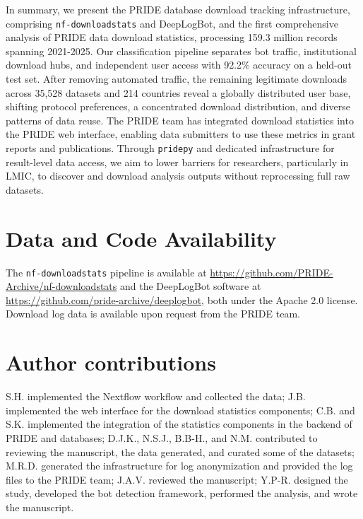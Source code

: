\documentclass[11pt,a4paper]{article}
\begin{document}
\begin{sloppypar}
In summary, we present the PRIDE database download tracking infrastructure, comprising \texttt{nf-downloadstats} and DeepLogBot, and the first comprehensive analysis of PRIDE data download statistics, processing 159.3 million records spanning 2021-2025. Our classification pipeline separates bot traffic, institutional download hubs, and independent user access with 92.2\% accuracy on a held-out test set. After removing automated traffic, the remaining legitimate downloads across 35,528 datasets and 214 countries reveal a globally distributed user base, shifting protocol preferences, a concentrated download distribution, and diverse patterns of data reuse. The PRIDE team has integrated download statistics into the PRIDE web interface, enabling data submitters to use these metrics in grant reports and publications. Through \texttt{pridepy} \citep{Kamatchinathan2025} and dedicated infrastructure for result-level data access, we aim to lower barriers for researchers, particularly in LMIC, to discover and download analysis outputs without reprocessing full raw datasets.\end{sloppypar}

\section*{Data and Code Availability}

\begin{sloppypar}
The \texttt{nf-downloadstats} pipeline is available at \url{https://github.com/PRIDE-Archive/nf-downloadstats} and the DeepLogBot software at \url{https://github.com/pride-archive/deeplogbot}, both under the Apache 2.0 license. Download log data is available upon request from the PRIDE team.
\end{sloppypar}

\section*{Author contributions}

\begin{sloppypar}
S.H. implemented the Nextflow workflow and collected the data; J.B. implemented the web interface for the download statistics components; C.B. and S.K. implemented the integration of the statistics components in the backend of PRIDE and databases; D.J.K., N.S.J., B.B-H., and N.M. contributed to reviewing the manuscript, the data generated, and curated some of the datasets; M.R.D. generated the infrastructure for log anonymization and provided the log files to the PRIDE team; J.A.V. reviewed the manuscript; Y.P-R. designed the study, developed the bot detection framework, performed the analysis, and wrote the manuscript.
\end{sloppypar}
\end{document}
